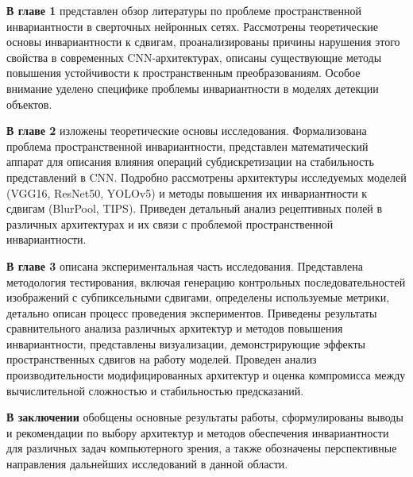\textbf{В главе 1} представлен обзор литературы по проблеме пространственной инвариантности в сверточных нейронных сетях. Рассмотрены теоретические основы инвариантности к сдвигам, проанализированы причины нарушения этого свойства в современных CNN-архитектурах, описаны существующие методы повышения устойчивости к пространственным преобразованиям. Особое внимание уделено специфике проблемы инвариантности в моделях детекции объектов.

\textbf{В главе 2} изложены теоретические основы исследования. Формализована проблема пространственной инвариантности, представлен математический аппарат для описания влияния операций субдискретизации на стабильность представлений в CNN. Подробно рассмотрены архитектуры исследуемых моделей (VGG16, ResNet50, YOLOv5) и методы повышения их инвариантности к сдвигам (BlurPool, TIPS). Приведен детальный анализ рецептивных полей в различных архитектурах и их связи с проблемой пространственной инвариантности.

\textbf{В главе 3} описана экспериментальная часть исследования. Представлена методология тестирования, включая генерацию контрольных последовательностей изображений с субпиксельными сдвигами, определены используемые метрики, детально описан процесс проведения экспериментов. Приведены результаты сравнительного анализа различных архитектур и методов повышения инвариантности, представлены визуализации, демонстрирующие эффекты пространственных сдвигов на работу моделей. Проведен анализ производительности модифицированных архитектур и оценка компромисса между вычислительной сложностью и стабильностью предсказаний.

\textbf{В заключении} обобщены основные результаты работы, сформулированы выводы и рекомендации по выбору архитектур и методов обеспечения инвариантности для различных задач компьютерного зрения, а также обозначены перспективные направления дальнейших исследований в данной области.